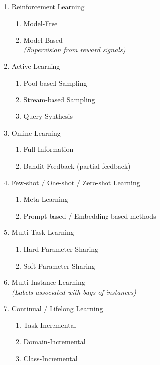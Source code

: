 \begin{enumerate}
    \item Reinforcement Learning
    \begin{enumerate}
      \item Model-Free
      \item Model-Based \\
      \textit{(Supervision from reward signals)}
    \end{enumerate}
    
    \item Active Learning
    \begin{enumerate}
      \item Pool-based Sampling
      \item Stream-based Sampling
      \item Query Synthesis
    \end{enumerate}
    
    \item Online Learning
    \begin{enumerate}
      \item Full Information
      \item Bandit Feedback (partial feedback)
    \end{enumerate}
    
    \item Few-shot / One-shot / Zero-shot Learning
    \begin{enumerate}
      \item Meta-Learning
      \item Prompt-based / Embedding-based methods
    \end{enumerate}
    
    \item Multi-Task Learning
    \begin{enumerate}
      \item Hard Parameter Sharing
      \item Soft Parameter Sharing
    \end{enumerate}
    
    \item Multi-Instance Learning \\
    \textit{(Labels associated with bags of instances)}
    
    \item Continual / Lifelong Learning
    \begin{enumerate}
      \item Task-Incremental
      \item Domain-Incremental
      \item Class-Incremental
    \end{enumerate}
    

\end{enumerate}

